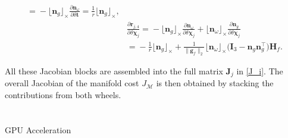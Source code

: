 \documentclass[journal,twoside,web]{ieeecolor}
\makeatletter
\let\origsection\section
\def\section{\@ifstar\sectionstarcolor\sectioncolor}
\def\sectioncolor#1{\origsection{\textcolor{nblue}{#1}}}
\def\sectionstarcolor#1{\origsection*{#1}}
\makeatother
\begin{document}
\begin{itemize}
\begin{equation}
\begin{aligned}
\!=\!
-\lfloor\mathbf{n}_g\rfloor_{\times}
\frac{\partial \mathbf{n}_\omega}{\partial \delta\mathbf{t}}
\!=\!
\frac{1}{r}\lfloor\mathbf{n}_g\rfloor_{\times},\\
&\frac{\partial \mathbf{r}_{j,4}}{\partial \delta\bm{\chi}_j}
\!=\!
-\lfloor\mathbf{n}_g\rfloor_{\times}
\frac{\partial \mathbf{n}_\omega}{\partial \delta\bm{\chi}_j}
+
\lfloor\mathbf{n}_\omega\rfloor_{\times}
\frac{\partial \mathbf{n}_g}{\partial \delta\bm{\chi}_j}\\
&=\!
-\frac{1}{r}\lfloor\mathbf{n}_g\rfloor_{\times}
\!+\!
\frac{1}{\|\mathbf{g}_f\|_2}
\lfloor\mathbf{n}_\omega\rfloor_{\times}
\bigl(\mathbf{I}_3\!-\!\mathbf{n}_g\mathbf{n}_g^\top\bigr)\mathbf{H}_f.
\end{aligned}
\end{equation}
\end{itemize}

All these Jacobian blocks are assembled into the full matrix \(\mathbf{J}_j\) in \eqref{J_i}. The overall Jacobian of the manifold cost \(J_{\mathcal{M}}\) is then obtained by stacking the contributions from both wheels.

\section{GPU Acceleration}
\end{document}
